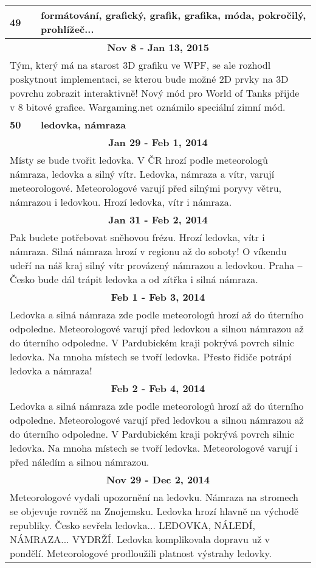 \begin{tabularx}{\linewidth}{l l}
\bf 49 & \bf formátování, grafický, grafik, grafika, móda, pokročilý, prohlížeč... \\ \midrule
\multicolumn{2}{c}{\bf Nov 8 - Jan 13, 2015} \\
\multicolumn{2}{p{\linewidth}}{Tým, který má na starost 3D grafiku ve WPF, se ale rozhodl poskytnout implementaci, se kterou bude možné 2D prvky na 3D povrchu zobrazit interaktivně! Nový mód pro World of Tanks přijde v 8 bitové grafice. Wargaming.net oznámilo speciální zimní mód.} \\ \midrule[1.5pt]

\bf 50 & \bf ledovka, námraza \\ \midrule
\multicolumn{2}{c}{\bf Jan 29 - Feb 1, 2014} \\
\multicolumn{2}{p{\linewidth}}{Místy se bude tvořit ledovka. V ČR hrozí podle meteorologů námraza, ledovka a silný vítr. Ledovka, námraza a vítr, varují meteorologové. Meteorologové varují před silnými poryvy větru, námrazou i ledovkou. Hrozí ledovka, vítr i námraza.} \\ \midrule
\multicolumn{2}{c}{\bf Jan 31 - Feb 2, 2014} \\
\multicolumn{2}{p{\linewidth}}{Pak budete potřebovat sněhovou frézu. Hrozí ledovka, vítr i námraza. Silná námraza hrozí v regionu až do soboty! O víkendu udeří na náš kraj silný vítr provázený námrazou a ledovkou. Praha – Česko bude dál trápit ledovka a od zítřka i silná námraza.} \\ \midrule
\multicolumn{2}{c}{\bf Feb 1 - Feb 3, 2014} \\
\multicolumn{2}{p{\linewidth}}{Ledovka a silná námraza zde podle meteorologů hrozí až do úterního odpoledne. Meteorologové varují před ledovkou a silnou námrazou až do úterního odpoledne. V Pardubickém kraji pokrývá povrch silnic ledovka. Na mnoha místech se tvoří ledovka. Přesto řidiče potrápí ledovka a námraza!} \\ \midrule
\multicolumn{2}{c}{\bf Feb 2 - Feb 4, 2014} \\
\multicolumn{2}{p{\linewidth}}{Ledovka a silná námraza zde podle meteorologů hrozí až do úterního odpoledne. Meteorologové varují před ledovkou a silnou námrazou až do úterního odpoledne. V Pardubickém kraji pokrývá povrch silnic ledovka. Na mnoha místech se tvoří ledovka. Meteorologové varují i před náledím a silnou námrazou.} \\ \midrule
\multicolumn{2}{c}{\bf Nov 29 - Dec 2, 2014} \\
\multicolumn{2}{p{\linewidth}}{Meteorologové vydali upozornění na ledovku. Námraza na stromech se objevuje rovněž na Znojemsku. Ledovka hrozí hlavně na východě republiky. Česko sevřela ledovka... LEDOVKA, NÁLEDÍ, NÁMRAZA... VYDRŽÍ. Ledovka komplikovala dopravu už v pondělí. Meteorologové prodloužili platnost výstrahy ledovky.} \\ \midrule

\end{tabularx}
